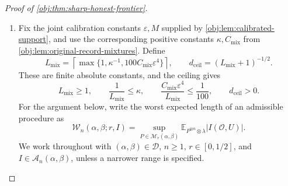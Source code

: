 \documentclass[11pt]{article}
\begin{document}
\begin{proof}[Proof of \cref{obj:thm:sharp-honest-frontier}]
\begin{enumerate}
\item Fix the joint calibration constants \(\varepsilon,M\) supplied by
\cref{obj:lem:calibrated-support}, and use the corresponding positive constants
\(\kappa,C_{\mathrm{mix}}\) from \cref{obj:lem:original-record-mixtures}. Define
\[
L_{\mathrm{mix}}
=
\left\lceil
\max\{1,\kappa^{-1},100C_{\mathrm{mix}}\varepsilon^4\}
\right\rceil,
\qquad
d_{\mathrm{ceil}}=(L_{\mathrm{mix}}+1)^{-1/2}.
\]
These are finite absolute constants, and the ceiling gives
\[
L_{\mathrm{mix}}\ge1,\qquad
\frac1{L_{\mathrm{mix}}}\le\kappa,\qquad
\frac{C_{\mathrm{mix}}\varepsilon^4}{L_{\mathrm{mix}}}
\le\frac1{100},\qquad
d_{\mathrm{ceil}}>0.
\]
For the argument below, write the worst expected length of an admissible procedure as
\[
\mathcal W_n(\alpha,\beta;r,I)
=
\sup_{P\in\mathcal M_r(\alpha,\beta)}
\mathbb E_{P^{\otimes n}\otimes\lambda}
|I(\mathcal O,U)|.
\]
We work throughout with \((\alpha,\beta)\in\mathcal D\), \(n\ge1\),
\(r\in[0,1/2]\), and \(I\in\mathcal A_n(\alpha,\beta)\), unless a narrower
range is specified.


\end{enumerate}
\end{proof}
\end{document}
